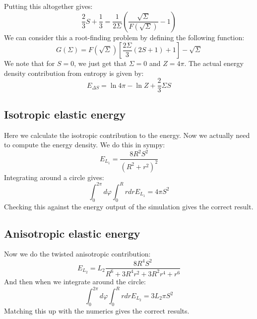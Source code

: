 \documentclass[reqno]{article}
\begin{document}
Putting this altogether gives:
\begin{equation}
    \frac23 S + \frac13
    =
    \frac{1}{2 \Sigma} \left( \frac{\sqrt{\Sigma}}{F \left( \sqrt{\Sigma} \right)} - 1 \right)
\end{equation}
We can consider this a root-finding problem by defining the following function:
\begin{equation}
    G(\Sigma)
    =
    F \left( \sqrt{\Sigma} \right) \left[ \frac{2 \Sigma}{3} \left(2S + 1 \right) + 1 \right] - \sqrt{\Sigma}
\end{equation}
We note that for $S = 0$, we just get that $\Sigma = 0$ and $Z = 4\pi$.
The actual energy density contribution from entropy is given by:
\begin{equation}
    E_{\Delta S}
    =
    \ln 4 \pi
    - \ln Z
    + \frac23 \Sigma S
\end{equation}

\subsection{Isotropic elastic energy}

Here we calculate the isotropic contribution to the energy.
Now we actually need to compute the energy density.
We do this in sympy:
\begin{equation}
    E_{L_1}
    =
    \frac{8 R^{2} S^{2}}{\left(R^{2} + r^{2}\right)^{2}}
\end{equation}
Integrating around a circle gives:
\begin{equation}
    \int_0^{2\pi} d \varphi \int_0^R r dr E_{L_1}
    =
    4 \pi S^2
\end{equation}
Checking this against the energy output of the simulation gives the correct result.

\subsection{Anisotropic elastic energy}

Now we do the twisted anisotropic contribution:
\begin{equation}
    E_{L_2}
    =
    L_2 \frac{8 R^{4} S^{2}}{R^{6} + 3 R^{4} r^{2} + 3 R^{2} r^{4} + r^{6}}
\end{equation}
And then when we integrate around the circle:
\begin{equation}
    \int_0^{2\pi} d\varphi \int_0^R r dr E_{L_2}
    =
    3 L_2 \pi S^2
\end{equation}
Matching this up with the numerics gives the correct results.
\end{document}
